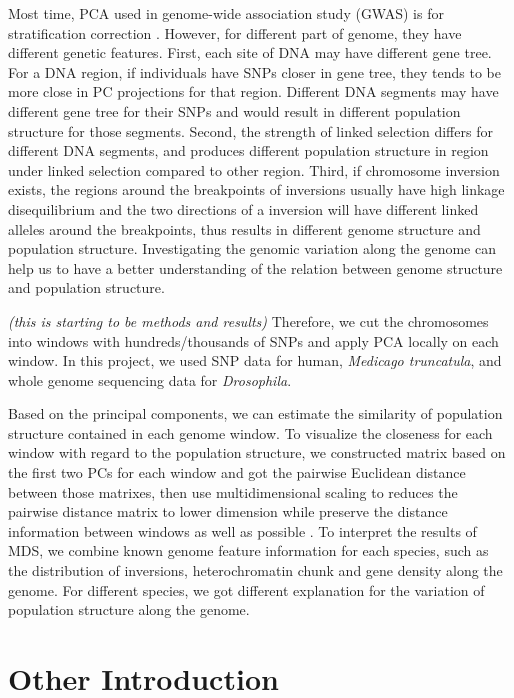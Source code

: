 \documentclass[11pt, oneside]{article}   	%
\newcommand{\plr}[1]{{\em \color{blue} #1}}
\begin{document}
Most time, PCA used in genome-wide association study (GWAS) is for stratification correction \cite{key7}. However, for different part of genome, they have different genetic features. First, each site of DNA may have different gene tree. For a DNA region, if individuals have SNPs closer in gene tree, they tends to be more close in PC projections for that region. Different DNA segments may have different gene tree for their SNPs and would result in different population structure for those segments. Second, the strength of linked selection differs for different DNA segments, and produces different population structure in region under linked selection compared to other region. Third, if chromosome inversion exists, the regions around the breakpoints of inversions usually have high linkage disequilibrium and the two directions of a inversion will have different linked alleles around the breakpoints, thus results in different genome structure and population structure. Investigating the genomic variation along the genome can help us to have a better understanding of the relation between genome structure and population structure. 

\plr{(this is starting to be methods and results)}
Therefore, we cut the chromosomes into windows with hundreds/thousands of SNPs and apply PCA locally on each window. In this project, we used SNP data for human, \textit{Medicago truncatula}, and whole genome sequencing data for \textit{Drosophila}.

Based on the principal components, we can estimate the similarity of population structure contained in each genome window. To visualize the closeness for each window with regard to the population structure, we constructed matrix based on the first two PCs for each window and got the pairwise Euclidean distance between those matrixes, then use multidimensional scaling to reduces the pairwise distance matrix to lower dimension while preserve the distance information between windows as well as possible \cite{key5}. To interpret the results of MDS, we combine known genome feature information for each species, such as the distribution of inversions, heterochromatin chunk and gene density along the genome. For different species, we got different explanation for the variation of population structure along the genome.

\section{Other Introduction}
\end{document}
